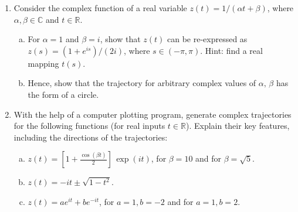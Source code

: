 \documentclass[10pt,a4paper]{article}
\begin{document}
\begin{enumerate}
\item
  Consider the complex function of a real variable $z(t) = 1/(\alpha t
  + \beta)$, where $\alpha, \beta \in \mathbb{C}$ and $t \in
  \mathbb{R}$.

  \begin{enumerate}[(a)]
  \item
    For $\alpha = 1$ and $\beta = i$, show that $z(t)$ can be
    re-expressed as $z(s) = (1+e^{is})/(2i)$, where
    $s \in (-\pi,\pi)$. Hint: find a real mapping $t(s)$.

  \item
    Hence, show that the trajectory for arbitrary complex values of
    $\alpha,\, \beta$ has the form of a circle.
  \end{enumerate}

\item
  With the help of a computer plotting program, generate complex
  trajectories for the following functions (for real inputs $t
  \in\mathbb{R}$). Explain their key features, including the
  directions of the trajectories:
  \begin{enumerate}[(a)]
  \item
    $\displaystyle z(t) = \left[1+\frac{\cos(\beta t)}{2}\right] \, \exp(it)$,
    for $\beta = 10$ and for $\beta = \sqrt{5}$.
  \item
    $\displaystyle z(t) = -it \pm \sqrt{1 - t^2}$.
  \item
    $\displaystyle z(t) = ae^{it} + be^{-it}$, for $a = 1, b = -2$
    and for $a = 1, b = 2$.
  \end{enumerate}
\end{enumerate}
\end{document}
